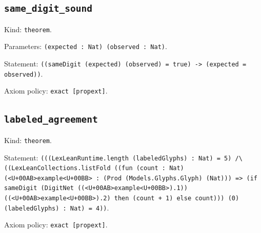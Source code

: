 \documentclass[11pt]{article}
\begin{document}
\subsection*{\texttt{same\_digit\_sound}}
\noindent Kind: \texttt{theorem}.\par
\noindent Parameters: \texttt{(expected : Nat) (observed : Nat)}.\par
\noindent Statement: \texttt{((sameDigit (expected) (observed) = true) -> (expected = observed))}.\par
\noindent Axiom policy: \texttt{exact [propext]}.\par
\subsection*{\texttt{labeled\_agreement}}
\noindent Kind: \texttt{theorem}.\par
\noindent Statement: \texttt{(((LexLeanRuntime.length (labeledGlyphs) : Nat) = 5) /\textbackslash{} ((LexLeanCollections.listFold ((fun (count : Nat) (<U+00AB>example<U+00BB> : (Prod (Models.Glyphs.Glyph) (Nat))) => (if sameDigit (DigitNet ((<U+00AB>example<U+00BB>).1)) ((<U+00AB>example<U+00BB>).2) then (count + 1) else count))) (0) (labeledGlyphs) : Nat) = 4))}.\par
\noindent Axiom policy: \texttt{exact [propext]}.\par
\end{document}
